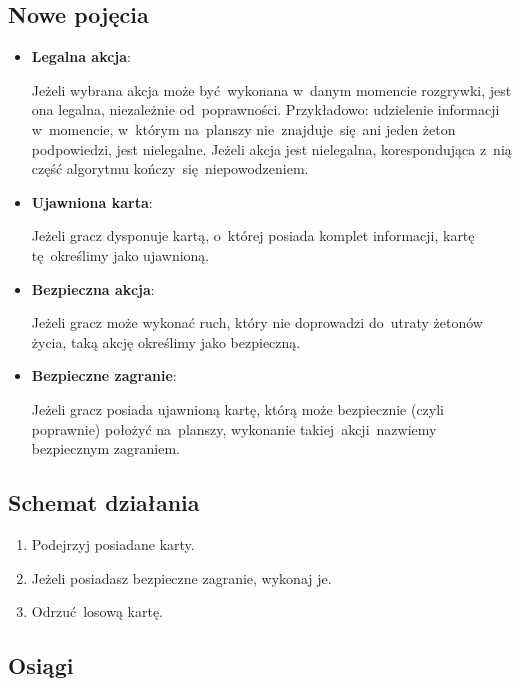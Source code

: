 \documentclass[declaration,shortabstract,inz]{iithesis}
\begin{document}
\subsection*{Nowe pojęcia}

\begin{itemize}

	\item \textbf{Legalna akcja}:
	
	Jeżeli wybrana akcja może być wykonana w~danym momencie rozgrywki, jest ona legalna, niezależnie od~poprawności. Przykładowo: udzielenie informacji w~momencie, w~którym na~planszy nie~znajduje~się ani jeden żeton podpowiedzi, jest nielegalne. Jeżeli akcja jest nielegalna, korespondująca z~nią część algorytmu kończy~się niepowodzeniem.
	
	\item \textbf{Ujawniona karta}:
	
	Jeżeli gracz dysponuje kartą, o~której posiada komplet informacji, kartę tę~określimy jako ujawnioną.
	
	\item \textbf{Bezpieczna akcja}:
	
	Jeżeli gracz może wykonać ruch, który nie doprowadzi do~utraty żetonów życia, taką akcję określimy jako bezpieczną.
	
	\item \textbf{Bezpieczne zagranie}:
	
	Jeżeli gracz posiada ujawnioną kartę, którą może bezpiecznie (czyli poprawnie) położyć na~planszy, wykonanie takiej akcji nazwiemy bezpiecznym zagraniem.
\end{itemize}

\subsection*{Schemat działania}

\begin{enumerate}
	\item Podejrzyj posiadane karty.
	\item Jeżeli posiadasz bezpieczne zagranie, wykonaj je.
	\item Odrzuć losową kartę.
\end{enumerate}

\subsection*{Osiągi}
\end{document}
